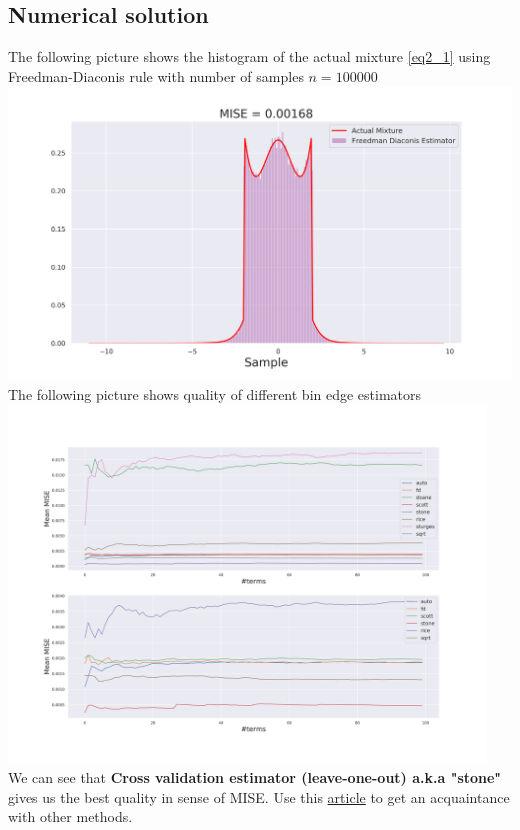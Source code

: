\documentclass[a4paper, 12pt]{article}
\begin{document}
\subsection{Numerical solution}
The following picture shows the histogram of the actual mixture \eqref{eq2_1} using Freedman-Diaconis rule with number of samples $n=100000$ \\
\includegraphics[width=\textwidth]{Images/Task2_1.png}
The following picture shows quality of different bin edge estimators \\
\includegraphics[width=\textwidth, height=9.5cm]{Images/Task2_2.png}\\
We can see that \textbf{Cross validation estimator (leave-one-out) a.k.a "stone"} gives us the best quality in sense of MISE. Use this \href{https://numpy.org/devdocs/reference/generated/numpy.histogram_bin_edges.html}{article} to get an acquaintance with other methods.
\end{document}
